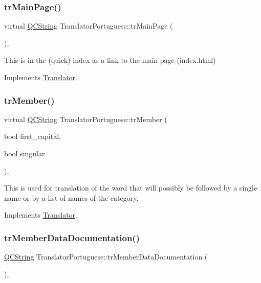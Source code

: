 \subsubsection{\texorpdfstring{trMainPage()}{trMainPage()}}
{\footnotesize\ttfamily virtual \mbox{\hyperlink{class_q_c_string}{Q\+C\+String}} Translator\+Portuguese\+::tr\+Main\+Page (\begin{DoxyParamCaption}{ }\end{DoxyParamCaption})\hspace{0.3cm}{\ttfamily [inline]}, {\ttfamily [virtual]}}

This is in the (quick) index as a link to the main page (index.\+html) 

Implements \mbox{\hyperlink{class_translator}{Translator}}.

\mbox{\label{class_translator_portuguese_afc3ce1ccaf2a1af687aed2f04c307547}} 
\subsubsection{\texorpdfstring{trMember()}{trMember()}}
{\footnotesize\ttfamily virtual \mbox{\hyperlink{class_q_c_string}{Q\+C\+String}} Translator\+Portuguese\+::tr\+Member (\begin{DoxyParamCaption}\item[{bool}]{first\+\_\+capital,  }\item[{bool}]{singular }\end{DoxyParamCaption})\hspace{0.3cm}{\ttfamily [inline]}, {\ttfamily [virtual]}}

This is used for translation of the word that will possibly be followed by a single name or by a list of names of the category. 

Implements \mbox{\hyperlink{class_translator}{Translator}}.

\mbox{\label{class_translator_portuguese_a0d6b063892d35726748f79e8a669e7d6}} 
\subsubsection{\texorpdfstring{trMemberDataDocumentation()}{trMemberDataDocumentation()}}
{\footnotesize\ttfamily \mbox{\hyperlink{class_q_c_string}{Q\+C\+String}} Translator\+Portuguese\+::tr\+Member\+Data\+Documentation (\begin{DoxyParamCaption}{ }\end{DoxyParamCaption})\hspace{0.3cm}{\ttfamily [inline]}, {\ttfamily [virtual]}}

